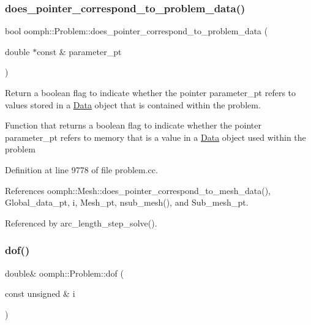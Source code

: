 \subsubsection{\texorpdfstring{does\+\_\+pointer\+\_\+correspond\+\_\+to\+\_\+problem\+\_\+data()}{does\_pointer\_correspond\_to\_problem\_data()}}
{\footnotesize\ttfamily bool oomph\+::\+Problem\+::does\+\_\+pointer\+\_\+correspond\+\_\+to\+\_\+problem\+\_\+data (\begin{DoxyParamCaption}\item[{double $\ast$const \&}]{parameter\+\_\+pt }\end{DoxyParamCaption})\hspace{0.3cm}{\ttfamily [protected]}}



Return a boolean flag to indicate whether the pointer parameter\+\_\+pt refers to values stored in a \hyperlink{classoomph_1_1Data}{Data} object that is contained within the problem. 

Function that returns a boolean flag to indicate whether the pointer parameter\+\_\+pt refers to memory that is a value in a \hyperlink{classoomph_1_1Data}{Data} object used within the problem 

Definition at line 9778 of file problem.\+cc.



References oomph\+::\+Mesh\+::does\+\_\+pointer\+\_\+correspond\+\_\+to\+\_\+mesh\+\_\+data(), Global\+\_\+data\+\_\+pt, i, Mesh\+\_\+pt, nsub\+\_\+mesh(), and Sub\+\_\+mesh\+\_\+pt.



Referenced by arc\+\_\+length\+\_\+step\+\_\+solve().

\mbox{\label{classoomph_1_1Problem_a74d71439b100fb5b66b94d1d69130f7c}} 
\subsubsection{\texorpdfstring{dof()}{dof()}\hspace{0.1cm}{\footnotesize\ttfamily [1/2]}}
{\footnotesize\ttfamily double\& oomph\+::\+Problem\+::dof (\begin{DoxyParamCaption}\item[{const unsigned \&}]{i }\end{DoxyParamCaption})\hspace{0.3cm}{\ttfamily [inline]}}



